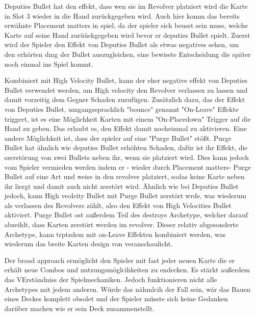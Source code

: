 Deputies Bullet hat den effekt, dass wen sie im Revolver platziert wird
die Karte in Slot 3 wieder in die Hand zurückgegeben wird. Auch hier komm das bereits erwähnte Placement matters in spiel,
da der spieler sich beusst sein muss, welche Karte auf seine Hand zurüückgegeben wird bevor er deputies Bullet spielt.
Zuerst wird der Spieler den Effekt von Deputies Bullet als etwas negatives sehen, um den erhörten dmg der Bullet auszugleichen,
eine bewisste Entscheidung die später noch einmal ins Spiel kommt.

Kombiniert mit High Velocity Bullet, kann der eher
negative effekt von Deputies Bullet verwendet werden, um High velocity den Revolver verlassen zu lassen und damit vorzeitig dem Gegner Schaden zuzufügen.
Zusätzlich dazu, das der Effekt von Deputies Bullet, umgangssprachlich "bounce" genannt "On-Leave" Effekte triggert,
ist es eine Möglichkeit Karten mit einem "On-Placedown" Trigger auf die Hand zu geben. Das erlaubt es, den Effekt damit nocheinmal zu aktivieren.
Eine andere Möglichkeit ist, dass der spieler auf eine "Purge Bullet" stößt. Purge Bullet hat ähnlich wie deputies Bullet
erhöhten Schaden, dafür ist ihr Effekt, die szerstörung von zwei Bullets neben ihr, wenn sie platziert wird. Dies kann
jedoch vom Spieler vermieden werden indem er - wieder durch Placement matters- Purge Bullet auf eine Art und weise in
den revolver platziert, sodas keine Karte neben ihr liergt und damit auch nicht zerstört wird. Ähnlich wie bei Deputies
Bullet jedoch, kann High veolcity Bullet mit Purge Bullet zerstört wrde, was wiederum als verlassen des Revolvers zählt,
also den Effekt von High Velocities Bullet aktiviert. Purge Bullet ost außerdem Teil des destroys Archetype, welcher
darauf abzeihlt, dass Karten zerstört werden im revolver.
Dieser relativ abgesonderte Archetype, kann trptzdem mit on-Leave Effekten kombiniert werden, was wiederum das breite Karten design von \FF veranschaulicht. %


Der broad approach ermöglicht den Spieler mit fast jeder neuen Karte die er erhält neue Combos und nutzungsmöglcihkeiten zu endecken.
Es stärkt außerdem das VErständniss der Spielmechaniken.
Jedoch funktionieren nicht alle \FF Archetypes mit jedem anderen. %
Würde das nähmlcih der Fall sein, wär das Bauen eines Deckes komplett obsolet und der Spieler müsste sich keine
Gedanken darüber machen wie er sein Deck zusammenstellt.



